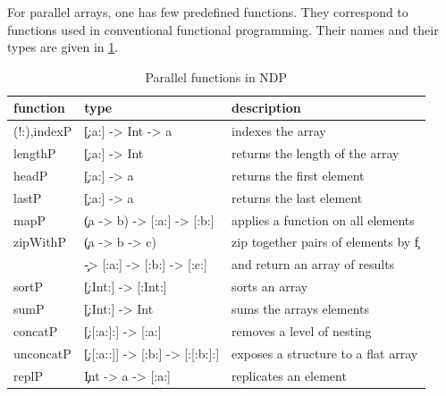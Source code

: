     
    
    
  \p
  For parallel arrays, one has few predefined functions.
  They correspond to functions used in conventional functional programming.
  Their names and their types are given in \ref{table:parfuns}.
  
  \begin{table}[h]
    \caption{Parallel functions in NDP}
    \label{table:parfuns}
    \begin{tabular}{lll}
        \toprule
        function & type & description \\
        \midrule
        (!:),indexP & \c{[:a:] -> Int -> a} & indexes the array \\
        lengthP & \c{[:a:] -> Int} & returns the length of the array \\
        headP & \c{[:a:] -> a} & returns the first element\\
        lastP & \c{[:a:] -> a} & returns the last element \\
        mapP & \c{(a -> b) -> [:a:] -> [:b:]} & applies a function on all elements \\
        zipWithP & \c{(a -> b -> c)} & zip together pairs of elements by \c{f} \\
         & \c{-> [:a:] -> [:b:] -> [:c:]} & and return an array of results \footnotemark \\
        sortP & \c{[:Int:] -> [:Int:]} & sorts an array \\
        sumP & \c{[:Int:] -> Int} & sums the arrays elements \\
        concatP & \c{[:[:a:]:] -> [:a:]} & removes a level of nesting \\
        unconcatP & \c{[:[:a::]] -> [:b:] -> [:[:b:]:]} & exposes a structure to a flat array \\
        replP & \c{Int -> a -> [:a:]} & replicates an element \\
    \end{tabular}
  \end{table}

